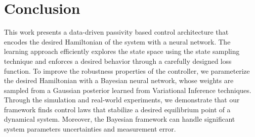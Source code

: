 \section{Conclusion}
\label{sec:bl_conclusion}

This work presents a data-driven passivity based control architecture that encodes
the desired Hamiltonian of the system with a neural network. 
%
The learning approach efficiently explores the state space using the state
sampling technique and enforces a desired behavior through a carefully
designed loss function.
%
To improve the robustness properties of the controller, we parameterize
the desired Hamiltonian with a Bayesian neural network, whose weights are
sampled from a Gaussian posterior learned from Variational Inference techniques.
%
Through the simulation and real-world experiments, we demonstrate that our framework finds control laws that stabilize a desired
equilibrium point of a dynamical system. 
%
Moreover, the Bayesian framework can handle significant system
parameters uncertainties and measurement error.

